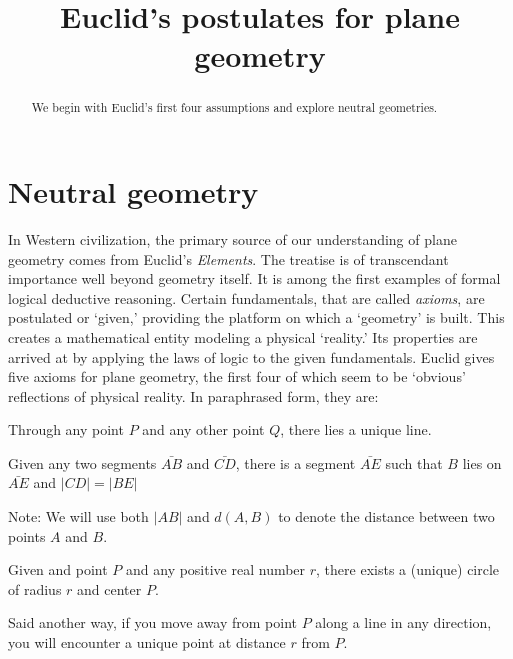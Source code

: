 \documentclass{ximera}
\title{Euclid's postulates for plane geometry} %
\begin{document}
\begin{abstract}
We begin with Euclid's first four assumptions and explore neutral
geometries.
\end{abstract}
\maketitle



\section*{Neutral geometry}




In Western civilization, the primary source of our understanding of
plane geometry comes from Euclid's \textit{Elements}. The treatise is
of transcendant importance well beyond geometry itself. It is among
the first examples of formal logical deductive reasoning. Certain
fundamentals, that are called \textit{axioms}, are postulated or
`given,' providing the platform on which a `geometry' is built. This
creates a mathematical entity modeling a physical `reality.' Its
properties are arrived at by applying the laws of logic to the given
fundamentals. Euclid gives five axioms for plane geometry, the first
four of which seem to be `obvious' reflections of physical reality. In
paraphrased form, they are:

\begin{axiom}[E1]
Through any point $P$ and any other point $Q$, there lies a unique
line.
\end{axiom}

\begin{axiom}[E2] 
Given any two segments $\bar{AB}$ and $\bar{CD}$, there is a
segment $\bar{AE}$ such that $B$ lies on $\bar{AE}$ and
$\left\vert CD\right\vert =\left\vert BE\right\vert $

Note: We will use both $\left\vert AB\right\vert$ and $d(A,B)$ to
denote the distance between two points $A$ and $B$.
\end{axiom}

\begin{axiom}[E3]
Given and point $P$ and any positive real number $r$, there exists a
(unique) circle of radius $r$ and center $P$. 

Said another way, if you move away from point $P$ along a line in any
direction, you will encounter a unique point at distance $r$ from $P$.
\end{axiom}
\end{document}

